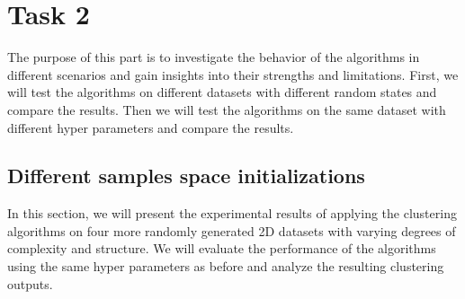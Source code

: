 \documentclass[12pt]{article}
\begin{document}
\section*{Task 2}\label{sec:task-2}
The purpose of this part is to investigate the behavior of the algorithms in different scenarios and gain insights into their strengths and limitations.
First, we will test the algorithms on different datasets with different random states and compare the results.
Then we will test the algorithms on the same dataset with different hyper parameters and compare the results.
\subsection*{Different samples space initializations}
In this section, we will present the experimental results of applying the clustering algorithms on four more randomly
generated 2D datasets with varying degrees of complexity and structure.
We will evaluate the performance of the algorithms using the same hyper parameters as before and analyze the resulting clustering outputs.
\\
\end{document}
